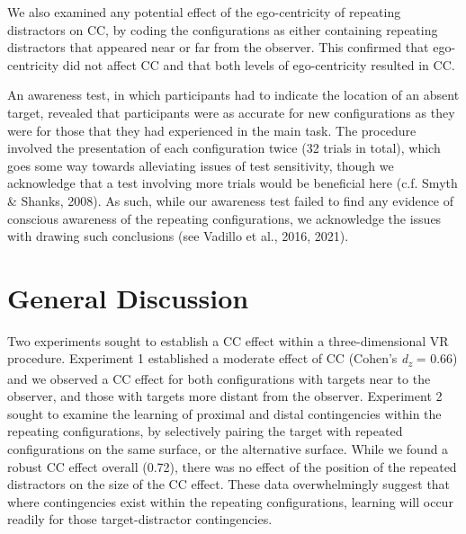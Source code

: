 \documentclass[
  man,floatsintext]{apa7}
\begin{document}
We also examined any potential effect of the ego-centricity of repeating distractors on CC, by coding the configurations as either containing repeating distractors that appeared near or far from the observer. This confirmed that ego-centricity did not affect CC and that both levels of ego-centricity resulted in CC.

An awareness test, in which participants had to indicate the location of an absent target, revealed that participants were as accurate for new configurations as they were for those that they had experienced in the main task. The procedure involved the presentation of each configuration twice (32 trials in total), which goes some way towards alleviating issues of test sensitivity, though we acknowledge that a test involving more trials would be beneficial here (c.f. Smyth \& Shanks, 2008). As such, while our awareness test failed to find any evidence of conscious awareness of the repeating configurations, we acknowledge the issues with drawing such conclusions (see Vadillo et al., 2016, 2021).

\hypertarget{general-discussion}{%
\section{General Discussion}\label{general-discussion}}

Two experiments sought to establish a CC effect within a three-dimensional VR procedure. Experiment 1 established a moderate effect of CC (Cohen's \emph{d\textsubscript{z}} = 0.66) and we observed a CC effect for both configurations with targets near to the observer, and those with targets more distant from the observer. Experiment 2 sought to examine the learning of proximal and distal contingencies within the repeating configurations, by selectively pairing the target with repeated configurations on the same surface, or the alternative surface. While we found a robust CC effect overall (0.72), there was no effect of the position of the repeated distractors on the size of the CC effect. These data overwhelmingly suggest that where contingencies exist within the repeating configurations, learning will occur readily for those target-distractor contingencies.
\end{document}
